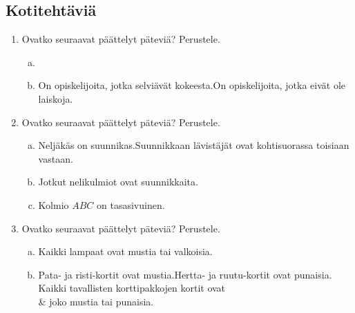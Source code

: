 \subsection*{Kotitehtäviä}

\begin{enumerate}
    \item Ovatko seuraavat päättelyt päteviä? Perustele.
        \begin{enumerate}[a)]
            \item {}
            \item {}
                {On opiskelijoita, jotka selviävät kokeesta.}{On opiskelijoita, jotka eivät ole laiskoja.}
        \end{enumerate}
    \item Ovatko seuraavat päättelyt päteviä? Perustele.
        \begin{enumerate}[a)]
            \item {}
                {Neljäkäs on suunnikas.}{Suunnikkaan lävistäjät ovat kohtisuorassa toisiaan vastaan.}
            \item {}
                {Jotkut nelikulmiot ovat suunnikkaita.}
            \item {}
                {Kolmio $ABC$ on tasasivuinen.}
        \end{enumerate}
    \item Ovatko seuraavat päättelyt päteviä? Perustele.
        \begin{enumerate}[a)]
            \item {}
                {Kaikki lampaat ovat mustia tai valkoisia.}
            \item {}
                {Pata- ja risti-kortit ovat mustia.}{Hertta- ja ruutu-kortit ovat punaisia.}
                {Kaikki tavallisten korttipakkojen kortit ovat\\ & joko mustia tai punaisia.}
        \end{enumerate}

\end{enumerate}
